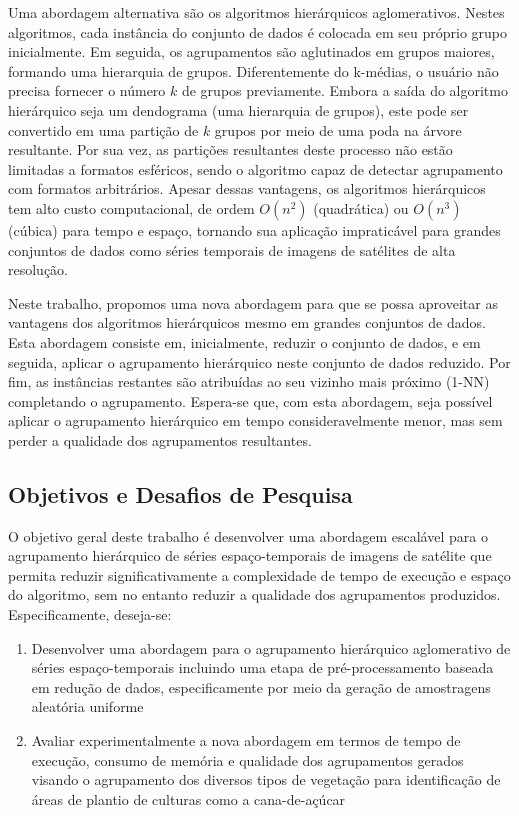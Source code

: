 Uma abordagem alternativa são os algoritmos hierárquicos aglomerativos. Nestes
algoritmos, cada instância do conjunto de dados é colocada em seu próprio grupo
inicialmente. Em seguida, os agrupamentos são aglutinados em grupos maiores, 
formando uma hierarquia de grupos. Diferentemente do k-médias, o usuário
não precisa fornecer o número $k$ de grupos previamente. Embora a saída do 
algoritmo hierárquico seja um dendograma (uma hierarquia de grupos), este pode
ser convertido em uma partição de $k$ grupos por meio de uma poda na árvore
resultante. Por sua vez, as partições resultantes deste processo não estão
limitadas a formatos esféricos, sendo o algoritmo capaz de detectar agrupamento
com formatos arbitrários. Apesar dessas vantagens, os algoritmos hierárquicos
tem alto custo computacional, de ordem $O(n^2)$ (quadrática) ou $O(n^3)$
(cúbica) para tempo e espaço, tornando sua aplicação impraticável para grandes
conjuntos de dados como séries temporais de imagens de satélites de alta
resolução.

Neste trabalho, propomos uma nova abordagem para que se possa aproveitar
as vantagens dos algoritmos hierárquicos mesmo em grandes conjuntos de dados.
Esta abordagem consiste em, inicialmente, reduzir o conjunto de dados, e em
seguida, aplicar o agrupamento hierárquico neste conjunto de dados reduzido. Por
fim, as instâncias restantes são atribuídas ao seu vizinho mais próximo (1-NN)
completando o agrupamento. Espera-se que, com esta abordagem, seja possível
aplicar o agrupamento hierárquico em tempo consideravelmente menor, mas sem
perder a qualidade dos agrupamentos resultantes.


\subsection{Objetivos e Desafios de Pesquisa}

O objetivo geral deste trabalho é desenvolver uma abordagem escalável para o
agrupamento hierárquico de séries espaço-temporais de imagens de satélite que
permita reduzir significativamente a complexidade de tempo de execução e espaço
do algoritmo, sem no entanto reduzir a qualidade dos agrupamentos produzidos.
Especificamente, deseja-se:

\begin{enumerate}
    \item Desenvolver uma abordagem para o agrupamento hierárquico aglomerativo
		de séries espaço-temporais incluindo uma etapa de pré-processamento baseada
		em redução de dados, especificamente por meio da geração de amostragens
		aleatória uniforme 
    
    \item Avaliar experimentalmente a nova abordagem em termos de tempo de
		execução, consumo de memória e qualidade dos agrupamentos gerados visando o
		agrupamento dos diversos tipos de vegetação para identificação de áreas de
		plantio de culturas como a cana-de-açúcar
\end{enumerate}

